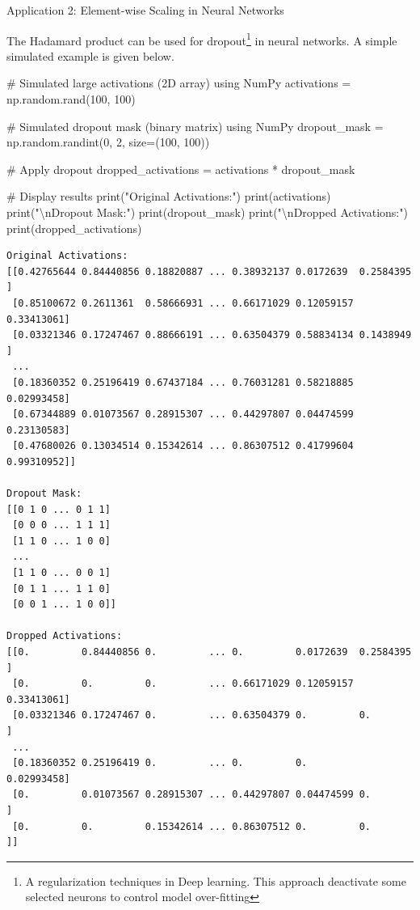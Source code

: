 \documentclass[
  letterpaper,
  DIV=11,
  numbers=noendperiod]{scrreprt}
\newenvironment{Shaded}{\begin{snugshade}}{\end{snugshade}}
\newcommand{\BuiltInTok}[1]{\textcolor[rgb]{0.00,0.23,0.31}{#1}}
\newcommand{\CharTok}[1]{\textcolor[rgb]{0.13,0.47,0.30}{#1}}
\newcommand{\CommentTok}[1]{\textcolor[rgb]{0.37,0.37,0.37}{#1}}
\newcommand{\DecValTok}[1]{\textcolor[rgb]{0.68,0.00,0.00}{#1}}
\newcommand{\NormalTok}[1]{\textcolor[rgb]{0.00,0.23,0.31}{#1}}
\newcommand{\OperatorTok}[1]{\textcolor[rgb]{0.37,0.37,0.37}{#1}}
\newcommand{\StringTok}[1]{\textcolor[rgb]{0.13,0.47,0.30}{#1}}
\theoremstyle{plain}
\theoremstyle{definition}
\theoremstyle{remark}
\begin{document}
Application 2: Element-wise Scaling in Neural Networks

The Hadamard product can be used for dropout\footnote{A regularization
  techniques in Deep learning. This approach deactivate some selected
  neurons to control model over-fitting} in neural networks. A simple
simulated example is given below.

\begin{Shaded}
\begin{Highlighting}[]
\CommentTok{\# Simulated large activations (2D array) using NumPy}
\NormalTok{activations }\OperatorTok{=}\NormalTok{ np.random.rand(}\DecValTok{100}\NormalTok{, }\DecValTok{100}\NormalTok{)}

\CommentTok{\# Simulated dropout mask (binary matrix) using NumPy}
\NormalTok{dropout\_mask }\OperatorTok{=}\NormalTok{ np.random.randint(}\DecValTok{0}\NormalTok{, }\DecValTok{2}\NormalTok{, size}\OperatorTok{=}\NormalTok{(}\DecValTok{100}\NormalTok{, }\DecValTok{100}\NormalTok{))}

\CommentTok{\# Apply dropout}
\NormalTok{dropped\_activations }\OperatorTok{=}\NormalTok{ activations }\OperatorTok{*}\NormalTok{ dropout\_mask}

\CommentTok{\# Display results}
\BuiltInTok{print}\NormalTok{(}\StringTok{"Original Activations:"}\NormalTok{)}
\BuiltInTok{print}\NormalTok{(activations)}
\BuiltInTok{print}\NormalTok{(}\StringTok{"}\CharTok{\textbackslash{}n}\StringTok{Dropout Mask:"}\NormalTok{)}
\BuiltInTok{print}\NormalTok{(dropout\_mask)}
\BuiltInTok{print}\NormalTok{(}\StringTok{"}\CharTok{\textbackslash{}n}\StringTok{Dropped Activations:"}\NormalTok{)}
\BuiltInTok{print}\NormalTok{(dropped\_activations)}
\end{Highlighting}
\end{Shaded}

\begin{verbatim}
Original Activations:
[[0.42765644 0.84440856 0.18820887 ... 0.38932137 0.0172639  0.2584395 ]
 [0.85100672 0.2611361  0.58666931 ... 0.66171029 0.12059157 0.33413061]
 [0.03321346 0.17247467 0.88666191 ... 0.63504379 0.58834134 0.1438949 ]
 ...
 [0.18360352 0.25196419 0.67437184 ... 0.76031281 0.58218885 0.02993458]
 [0.67344889 0.01073567 0.28915307 ... 0.44297807 0.04474599 0.23130583]
 [0.47680026 0.13034514 0.15342614 ... 0.86307512 0.41799604 0.99310952]]

Dropout Mask:
[[0 1 0 ... 0 1 1]
 [0 0 0 ... 1 1 1]
 [1 1 0 ... 1 0 0]
 ...
 [1 1 0 ... 0 0 1]
 [0 1 1 ... 1 1 0]
 [0 0 1 ... 1 0 0]]

Dropped Activations:
[[0.         0.84440856 0.         ... 0.         0.0172639  0.2584395 ]
 [0.         0.         0.         ... 0.66171029 0.12059157 0.33413061]
 [0.03321346 0.17247467 0.         ... 0.63504379 0.         0.        ]
 ...
 [0.18360352 0.25196419 0.         ... 0.         0.         0.02993458]
 [0.         0.01073567 0.28915307 ... 0.44297807 0.04474599 0.        ]
 [0.         0.         0.15342614 ... 0.86307512 0.         0.        ]]
\end{verbatim}
\end{document}
